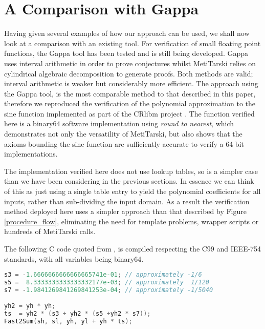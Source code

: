 \documentclass{fac}
\begin{document}
\section{A Comparison with Gappa}
\label{gappa}

Having given several examples of how our approach can be used, we shall now look at a comparison with an existing tool. For verification of small floating point functions, the Gappa tool \cite{de2006assisted,boldo2009combining} has been tested and is still being developed. Gappa uses interval arithmetic in order to prove conjectures whilst MetiTarski relies on cylindrical algebraic decomposition to generate proofs. Both methods are valid; interval arithmetic is weaker but considerably more efficient. The approach using the Gappa tool, is the most comparable method to that described in this paper, therefore we reproduced the verification of the polynomial approximation to the sine function implemented as part of the CRlibm project \cite{daramy2009cr,5483294}. The function verified here is a binary64 software implementation using \textit{round to nearest}, which demonstrates not only the versatility of MetiTarski, but also shows that the axioms bounding the sine function are sufficiently accurate to verify a 64 bit implementations.

The implementation verified here does not use lookup tables, so is a simpler case than we have been considering in the previous sections. In essence we can think of this as just using a single table entry to yield the polynomial coefficients for all inputs, rather than sub-dividing the input domain. As a result the verification method deployed here uses a simpler approach than that described by Figure \ref{procedure_flow}, eliminating the need for template problems, wrapper scripts or hundreds of MetiTarski calls. 

The following C code quoted from \cite{5483294}, is compiled respecting the C99 and IEEE-754 standards, with all variables being binary64. 

\begin{lstlisting}[language=C]
s3 = -1.6666666666666665741e-01; // approximately -1/6
s5 =  8.3333333333333332177e-03; // approximately  1/120
s7 = -1.9841269841269841253e-04; // approximately -1/5040

yh2 = yh * yh;
ts  = yh2 * (s3 + yh2 * (s5 +yh2 * s7));
Fast2Sum(sh, sl, yh, yl + yh * ts);
\end{lstlisting}
\end{document}
